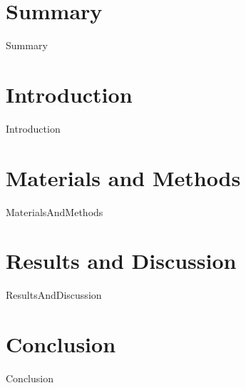 \documentclass[12pt,a4paper]{article}
\begin{document}
    \section{Summary}
        {Summary}
    \section{Introduction}
        {Introduction}
    \section{Materials and Methods}
        {MaterialsAndMethods}
    \section{Results and Discussion}
		{ResultsAndDiscussion}
    \section{Conclusion}
        {Conclusion}
    
\end{document}
